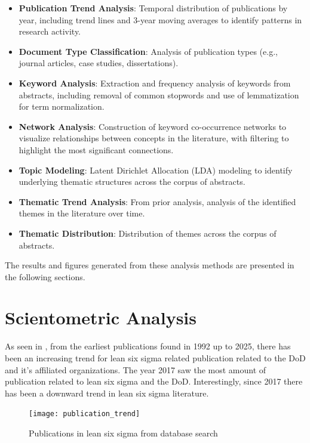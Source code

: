\documentclass{article}
\begin{document}
	\begin{itemize}
		\item \textbf{Publication Trend Analysis}: Temporal distribution of publications by year, including trend lines and 3-year moving averages to identify patterns in research activity.
		
		\item \textbf{Document Type Classification}: Analysis of publication types (e.g., journal articles, case studies, dissertations).
		
		\item \textbf{Keyword Analysis}: Extraction and frequency analysis of keywords from abstracts, including removal of common stopwords and use of lemmatization for term normalization.
		
		\item \textbf{Network Analysis}: Construction of keyword co-occurrence networks to visualize relationships between concepts in the literature, with filtering to highlight the most significant connections.
		
		\item \textbf{Topic Modeling}: Latent Dirichlet Allocation (LDA) modeling to identify underlying thematic structures across the corpus of abstracts.
		
		\item \textbf{Thematic Trend Analysis}: From prior analysis, analysis of the identified themes in the literature over time.

		\item \textbf{Thematic Distribution}: Distribution of themes across the corpus of abstracts.
	\end{itemize}

	The results and figures generated from these analysis methods are presented in the following sections.

	\section{Scientometric Analysis}

	As seen in , from the earliest publications found in 1992 up to 2025, there has been an increasing trend for lean six sigma related publication related to the DoD and it's affiliated organizations.
	The year 2017 saw the most amount of publication related to lean six sigma and the DoD.
	Interestingly, since 2017 there has been a downward trend in lean six sigma literature.


	\begin{figure}[htbp]
	\centering
	\texttt{[image: publication\_trend]}
	\caption{Publications in lean six sigma from database search}
	\label{fig:publication_trend}
	\end{figure}
\end{document}
